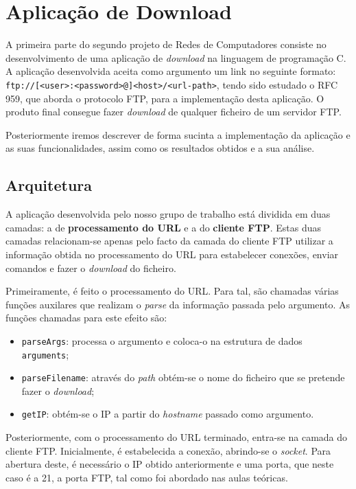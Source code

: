 \documentclass[article, a4paper, 11pt, oneside]{memoir}
\begin{document}
\chapter[Aplicação de Download][Aplicação de Download]{Aplicação de Download} \label{\thechapter}

A primeira parte do segundo projeto de Redes de Computadores consiste no desenvolvimento de uma
aplicação de \textit{download} na linguagem de programação C. A aplicação desenvolvida aceita 
como argumento um link no seguinte formato: \verb|ftp://[<user>:<password>@]<host>/<url-path>|,
tendo sido estudado o RFC 959, que aborda o protocolo FTP, para a implementação desta aplicação.
O produto final consegue fazer \textit{download} de qualquer ficheiro de um servidor FTP. 

Posteriormente iremos descrever de forma sucinta a implementação da aplicação e as suas
funcionalidades, assim como os resultados obtidos e a sua análise.

\section{Arquitetura}

A aplicação desenvolvida pelo nosso grupo de trabalho está dividida em duas camadas: a de 
\textbf{processamento do URL} e a do \textbf{cliente FTP}. Estas duas camadas relacionam-se
apenas pelo facto da camada do cliente FTP utilizar a informação obtida no processamento do URL
para estabelecer conexões, enviar comandos e fazer o \textit{download} do ficheiro.

Primeiramente, é feito o processamento do URL. Para tal, são chamadas várias funções auxilares
que realizam o \textit{parse} da informação passada pelo argumento. As funções chamadas
para este efeito são:

\begin{itemize}
  \item \verb|parseArgs|: processa o argumento e coloca-o na estrutura de dados \verb|arguments|;
  \item \verb|parseFilename|: através do \textit{path} obtém-se o nome do ficheiro que se pretende
fazer o \textit{download};
  \item \verb|getIP|: obtém-se o IP a partir do \textit{hostname} passado como argumento.
\end{itemize}

Posteriormente, com o processamento do URL terminado, entra-se na camada do cliente FTP.
Inicialmente, é estabelecida a conexão, abrindo-se o \textit{socket}. Para abertura deste, é
necessário o IP obtido anteriormente e uma porta, que neste caso é a 21, a porta FTP,
tal como foi abordado nas aulas teóricas.
\end{document}
